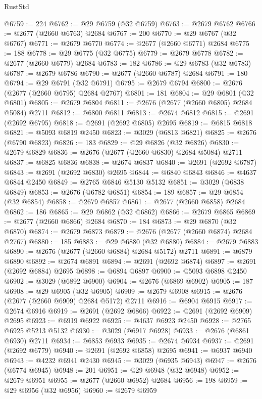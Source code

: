 \begin{lexlean}{RustStd}
\begin{coremodule}
{\begin{coremodule}
{{{{{{{{{{{{{{{{{{{{{{{{{{{{{{{{{{{{{{{{{{{{{{{{{{{{{{{@6759 := 224
@6762 := @29 @6759 (@32 @6759)
@6763 := @2679 @6762
@6766 := @2677 (@2660 @6763) @2684
@6767 := 200
@6770 := @29 @6767 (@32 @6767)
@6771 := @2679 @6770
@6774 := @2677 (@2660 @6771) @2684
@6775 := 188
@6778 := @29 @6775 (@32 @6775)
@6779 := @2679 @6778
@6782 := @2677 (@2660 @6779) @2684
@6783 := 182
@6786 := @29 @6783 (@32 @6783)
@6787 := @2679 @6786
@6790 := @2677 (@2660 @6787) @2684
@6791 := 180
@6794 := @29 @6791 (@32 @6791)
@6795 := @2679 @6794
@6800 := @2676 (@2677 (@2660 @6795) @2684 @2767)
@6801 := 181
@6804 := @29 @6801 (@32 @6801)
@6805 := @2679 @6804
@6811 := @2676 (@2677 (@2660 @6805) @2684 @5084) @2711
@6812 := @6800 @6811
@6813 := @2674 @6812
@6815 := @2691 (@2692 @6795)
@6818 := @2691 (@2692 @6805) @2695
@6819 := @6815 @6818
@6821 := @5093 @6819 @2450
@6823 := @3029 (@6813 @6821)
@6825 := @2676 (@6790 @6823)
@6826 := 183
@6829 := @29 @6826 (@32 @6826)
@6830 := @2679 @6829
@6836 := @2676 (@2677 (@2660 @6830) @2684 @5084) @2711
@6837 := @6825 @6836
@6838 := @2674 @6837
@6840 := @2691 (@2692 @6787)
@6843 := @2691 (@2692 @6830) @2695
@6844 := @6840 @6843
@6846 := @4637 @6844 @2450
@6849 := @2765 @6846 @5130 @5132
@6851 := @3029 (@6838 @6849)
@6853 := @2676 (@6782 @6851)
@6854 := 189
@6857 := @29 @6854 (@32 @6854)
@6858 := @2679 @6857
@6861 := @2677 (@2660 @6858) @2684
@6862 := 186
@6865 := @29 @6862 (@32 @6862)
@6866 := @2679 @6865
@6869 := @2677 (@2660 @6866) @2684
@6870 := 184
@6873 := @29 @6870 (@32 @6870)
@6874 := @2679 @6873
@6879 := @2676 (@2677 (@2660 @6874) @2684 @2767)
@6880 := 185
@6883 := @29 @6880 (@32 @6880)
@6884 := @2679 @6883
@6890 := @2676 (@2677 (@2660 @6884) @2684 @5172) @2711
@6891 := @6879 @6890
@6892 := @2674 @6891
@6894 := @2691 (@2692 @6874)
@6897 := @2691 (@2692 @6884) @2695
@6898 := @6894 @6897
@6900 := @5093 @6898 @2450
@6902 := @3029 (@6892 @6900)
@6904 := @2676 (@6869 @6902)
@6905 := 187
@6908 := @29 @6905 (@32 @6905)
@6909 := @2679 @6908
@6915 := @2676 (@2677 (@2660 @6909) @2684 @5172) @2711
@6916 := @6904 @6915
@6917 := @2674 @6916
@6919 := @2691 (@2692 @6866)
@6922 := @2691 (@2692 @6909) @2695
@6923 := @6919 @6922
@6925 := @4637 @6923 @2450
@6928 := @2765 @6925 @5213 @5132
@6930 := @3029 (@6917 @6928)
@6933 := @2676 (@6861 @6930) @2711
@6934 := @6853 @6933
@6935 := @2674 @6934
@6937 := @2691 (@2692 @6779)
@6940 := @2691 (@2692 @6858) @2695
@6941 := @6937 @6940
@6943 := @4232 @6941 @2430
@6945 := @3029 (@6935 @6943)
@6947 := @2676 (@6774 @6945)
@6948 := 201
@6951 := @29 @6948 (@32 @6948)
@6952 := @2679 @6951
@6955 := @2677 (@2660 @6952) @2684
@6956 := 198
@6959 := @29 @6956 (@32 @6956)
@6960 := @2679 @6959
}}}}}}}}}}}}}}}}}}}}}}}}}}}}}}}}}}}}}}}}}}}}}}}}}}}}}}}
\end{coremodule}}
\end{coremodule}
\end{lexlean}

